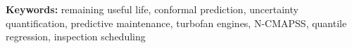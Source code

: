 \documentclass[PHM]{PHMSociety}
\begin{document}
\noindent\textbf{Keywords:} remaining useful life, conformal prediction, uncertainty quantification, predictive maintenance, turbofan engines, N-CMAPSS, quantile regression, inspection scheduling

\end{document}
